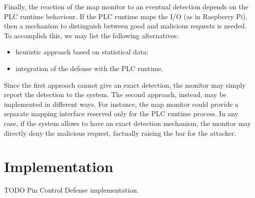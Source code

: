 Finally, the reaction of the map monitor to an eventual detection depends on the PLC runtime behaviour. If the PLC runtime maps the I/O (as in Raspberry Pi),
then a mechanism to distinguish between good and malicious requests is needed. To accomplish this, we may list the following alternatives:
\begin{itemize}
	\item heuristic approach based on statistical data;
	\item integration of the defense with the PLC runtime.
\end{itemize}
Since the first approach cannot give an exact detection, the monitor may simply report the detection to the system.
The second approach, instead, may be implemented in different ways. For instance, the map monitor could provide a separate mapping interface
reserved only for the PLC runtime process.
In any case, if the system allows to have an exact detection mechanism, the monitor may directly deny the malicious request, factually raising the bar for the attacker.


\section{Implementation}
\label{sec:def_impl}

TODO Pin Control Defense implementation.
